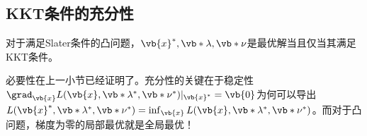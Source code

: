 \subsection{KKT条件的充分性}

\begin{BoxTheorem}[KKT条件]
    对于满足Slater条件的凸问题，$\vb{x}^{*},\vb*{\lambda},\vb*{\nu}$是最优解当且仅当其满足KKT条件。
\end{BoxTheorem}

\begin{Proof}
    必要性在上一小节已经证明了。充分性的关键在于稳定性$\grad_{\vb{x}}L(\vb{x},\vb*{\lambda}^{*},\vb*{\nu}^{*})|_{\vb{x}^{*}}=\vb{0}$为何可以导出 $L(\vb{x}^{*},\vb*{\lambda}^{*},\vb*{\nu}^{*})=\inf_{\vb{x}}L(\vb{x},\vb*{\lambda}^{*},\vb*{\nu}^{*})$。而对于凸问题，梯度为零的局部最优就是全局最优！
\end{Proof}
